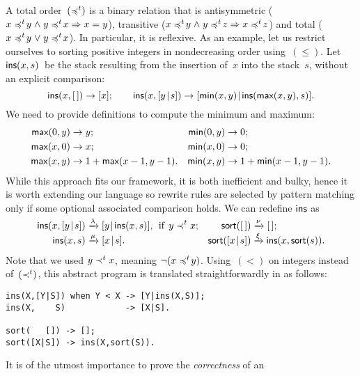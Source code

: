 A total order~\((\mathrel{\preccurlyeq^t\!}\,)\) is a binary relation that is
antisymmetric (\(x \mathrel{\preccurlyeq^t\!} y \mathrel{\wedge} y \mathrel{\preccurlyeq^t\!} x
\Rightarrow x = y\)), transitive (\(x \mathrel{\preccurlyeq^t\!} y \mathrel{\wedge} y
\mathrel{\preccurlyeq^t\!} z \Rightarrow x \mathrel{\preccurlyeq^t\!} z\)) and total (\(x \mathrel{\preccurlyeq^t\!} y
\mathrel{\vee} y \mathrel{\preccurlyeq^t\!} x\)). In particular, it is reflexive. As an
example, let us restrict ourselves to sorting positive integers in
nondecreasing order using~\((\leqslant)\). Let \(\textsf{ins}(x,s)\)~be
the stack resulting from the insertion of~\(x\) into the stack~\(s\),
without an explicit comparison:
\begin{equation*}
 \textsf{ins}(x,[\,])         \rightarrow [x];\qquad
 \textsf{ins}(x,[{y}\!\mid\!{s}]) \rightarrow
    [{\textsf{min}(x,y)}\!\mid\!{\textsf{ins}(\textsf{max}(x,y),s)}].
\end{equation*}
We need to provide definitions to compute the minimum and maximum:
\begin{align*}
\textsf{max}(0,y) &\rightarrow y; & \textsf{min}(0,y) &\rightarrow 0;\\
\textsf{max}(x,0) &\rightarrow x; & \textsf{min}(x,0) &\rightarrow 0;\\
\textsf{max}(x,y) &\rightarrow 1 + \textsf{max}(x-1,y-1).
 & \textsf{min}(x,y) &\rightarrow 1 + \textsf{min}(x-1,y-1).
\end{align*}
While this approach fits our framework, it is both inefficient and
bulky, hence it is worth extending our language so rewrite rules are
selected by pattern matching only if some optional associated
comparison holds. We can redefine \(\textsf{ins}\) as
\begin{align*}
\fun{ins}(x,\cons{y}{s})   &\smashedrightarrow{\lambda}
                             \cons{y}{\fun{ins}(x,s)},
                             \;\,\text{if} \,\; y \total x;
& \fun{sort}(\el)          &\smashedrightarrow{\nu} \el;\\
\fun{ins}(x,s)             &\smashedrightarrow{\mu} \cons{x}{s}.
& \fun{sort}(\cons{x}{s})  &\smashedrightarrow{\xi} 
                             \fun{ins}(x,\fun{sort}(s)).
\end{align*}
Note that we used \({y \mathrel{\prec^t} x}\), meaning \(\neg(x \mathrel{\preccurlyeq^t\!}
y)\). Using~\((<)\) on integers instead of~\((\mathrel{\prec^t})\), this abstract
program is translated straightforwardly in \Erlang as follows:
\begin{verbatim}
ins(X,[Y|S]) when Y < X -> [Y|ins(X,S)];
ins(X,    S)            -> [X|S].

sort(   []) -> [];
sort([X|S]) -> ins(X,sort(S)).
\end{verbatim}
It is of the utmost importance to prove the \emph{correctness} of an
